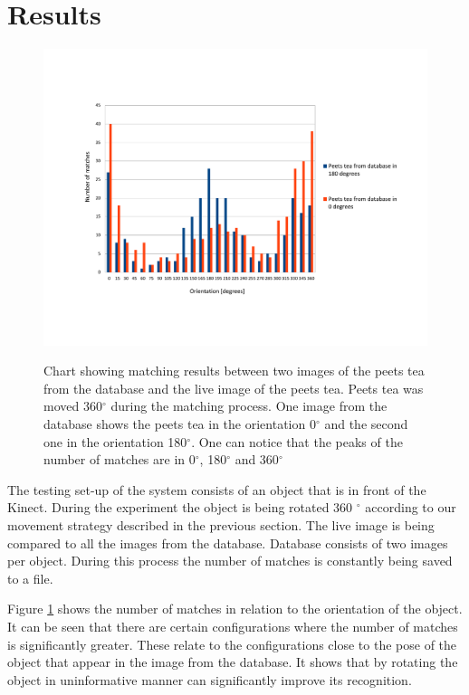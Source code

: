 \section{Results}

\begin{figure}

\includegraphics[width=1.5\columnwidth]{figures/print.pdf}\\


\caption{Chart showing matching results between two images of the peets tea from the database and the live image of the peets tea. Peets tea was moved 360$^\circ$ during the matching process. One image from the database shows the peets tea in the orientation 0$^\circ$ and the second one in the orientation 180$^\circ$. One can notice that the peaks of the number of matches are in 0$^\circ$, 180$^\circ$ and 360$^\circ$}
\label{fig:recognition-results}
\end{figure}
The testing set-up of the system consists of an object that is in front of the Kinect. During the experiment the object is being rotated 360 $^\circ$ according to our movement strategy described in the previous section. The live image is being compared to all the images from the database. Database consists of two images per object. During this process the number of matches is constantly being saved to a file.

Figure \ref{fig:recognition-results} shows the number of matches in relation to the orientation of the object. It can be seen that there are certain configurations where the number of matches is significantly greater. These relate to the configurations close to the pose of the object that appear in the image from the database. It shows that by rotating the object in uninformative manner can significantly improve its recognition. 

